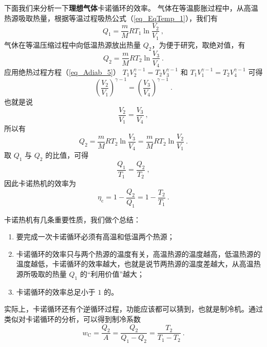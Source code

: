 下面我们来分析一下\textbf{理想气体}卡诺循环的效率。 气体在等温膨胀过程中，从高温热源吸取热量，根据等温过程吸热公式（\autoref{eq_EqTemp_1}），我们有
\begin{equation}\label{eq_Carnot_1}
Q_{1}=\frac{m}{M} R T_{1} \ln \frac{V_{2}}{V_{1}}~,
\end{equation}
气休在等温压缩过程中向低温热源放出热量 $Q_2$，为便于研究，取绝对值，有
\begin{equation}\label{eq_Carnot_2}
Q_{2}=\frac{m}{M} R T_{2} \ln \frac{V_{3}}{V_{4}}~.
\end{equation}
应用绝热过程方程（\autoref{eq_Adiab_5}） $T_{1} V_{2}^{\gamma-1}=T_{2} V_{3}^{\gamma-1}$ 和 $T_{1} V_{1}^{\gamma-1}=T_{2} V_{4}^{\gamma-1}$ 可得
\begin{equation}
\left(\frac{V_{2}}{V_{1}}\right)^{\gamma-1}=\left(\frac{V_{3}}{V_{4}}\right)^{\gamma-1}~.
\end{equation}
也就是说
\begin{equation}\label{eq_Carnot_3}
\frac{V_{2}}{V_{1}}=\frac{V_{3}}{V_{4}}~,
\end{equation}
所以有
\begin{equation}
Q_{2}=\frac{m}{M} R T_{2} \ln \frac{V_{3}}{V_{4}}=\frac{m}{M} R T_{2} \ln \frac{V_{2}}{V_{1}}~.
\end{equation}
取 $Q_1$ 与 $Q_2$ 的比值，可得
\begin{equation}\label{eq_Carnot_4}
\frac{Q_{1}}{T_{1}}=\frac{Q_{2}}{T_{2}}~,
\end{equation}
因此卡诺热机的效率为
\begin{equation}
\eta_{\mathrm{c}}=1-\frac{Q_{2}}{Q_{1}}=1-\frac{T_{2}}{T_{1}}~.
\end{equation}


卡诺热机有几条重要性质，我们做个总结：
\begin{enumerate}
\item 要完成一次卡诺循环必须有高温和低温两个热源；
\item 卡诺循环的效率只与两个热源的温度有关，高温热源的温度越高，低温热源的温度越低，卡诺循环的效率越大，也就是说节两热源的温度差越大，从高温热源所吸取的热量 $Q_1$ 的“利用价值”越大；
\item 卡诺循环的效率总足小于 $1 $ 的。
\end{enumerate}

实际上，卡诺循环还有个逆循环过程，功能应该都可以猜到，也就是制冷机。通过类似对卡诺循环的分析，可以得到制冷系数
\begin{equation}
w_{\mathrm{C}}=\frac{Q_{2}}{A}=\frac{Q_{2}}{Q_{1}-Q_{2}}=\frac{T_{2}}{T_{1}-T_{2}}~.
\end{equation}

